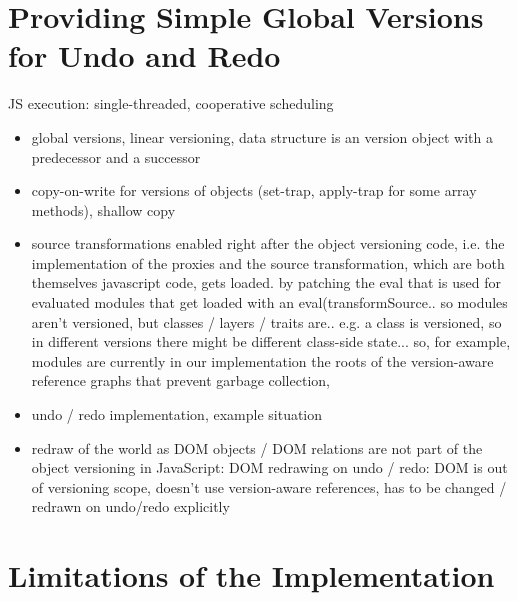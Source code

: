 \section{Providing Simple Global Versions for Undo and Redo}

JS execution: single-threaded, cooperative scheduling 

\begin{itemize}
    \item global versions, linear versioning, data structure is an version object with a predecessor and a successor
    \item copy-on-write for versions of objects (set-trap, apply-trap for some array methods), shallow copy
\end{itemize}


\begin{itemize}
    \item source transformations enabled right after the object versioning code, i.e. the implementation of the proxies and the source transformation, which are both themselves javascript code, gets loaded. by patching the eval that is used for evaluated modules that get loaded with an eval(transformSource.. so modules aren’t versioned, but classes / layers / traits are.. e.g. a class is versioned, so in different versions there might be different class-side state... so, for example, modules are currently in our implementation the roots of the version-aware reference graphs that prevent garbage collection, 
\end{itemize}


\begin{itemize}
    \item undo / redo implementation, example situation
    \item redraw of the world as DOM objects / DOM relations are not part of the object versioning in JavaScript: DOM redrawing on undo / redo: DOM is out of versioning scope, doesn’t use version-aware references, has to be changed / redrawn on undo/redo explicitly
    
\end{itemize}






\section{Limitations of the Implementation}




